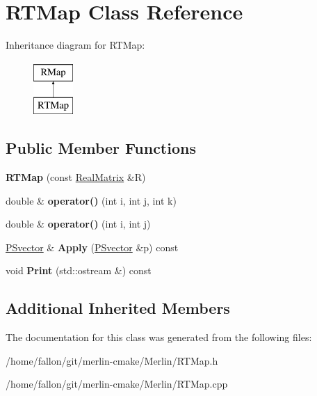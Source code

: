 \hypertarget{classRTMap}{}\section{R\+T\+Map Class Reference}
\label{classRTMap}
Inheritance diagram for R\+T\+Map\+:\begin{figure}[H]
\begin{center}
\leavevmode
\includegraphics[height=2.000000cm]{classRTMap}
\end{center}
\end{figure}
\subsection*{Public Member Functions}
\begin{DoxyCompactItemize}
\item 
\mbox{\label{classRTMap_aade87acf520b03c47e0f9a81e48fb4f3}} 
{\bfseries R\+T\+Map} (const \hyperlink{classTLAS_1_1Matrix}{Real\+Matrix} \&R)
\item 
\mbox{\label{classRTMap_a37c8097dc4bcf3fc17a6e6a8aaeb53d1}} 
double \& {\bfseries operator()} (int i, int j, int k)
\item 
\mbox{\label{classRTMap_a0fc735f8f3ef682249cf3f0e312daee1}} 
double \& {\bfseries operator()} (int i, int j)
\item 
\mbox{\label{classRTMap_a1267b88f696b11fb565adf0dec59581c}} 
\hyperlink{classPSvector}{P\+Svector} \& {\bfseries Apply} (\hyperlink{classPSvector}{P\+Svector} \&p) const
\item 
\mbox{\label{classRTMap_a1a6ba2770f3be2f9c2bb23a6b054ef69}} 
void {\bfseries Print} (std\+::ostream \&) const
\end{DoxyCompactItemize}
\subsection*{Additional Inherited Members}


The documentation for this class was generated from the following files\+:\begin{DoxyCompactItemize}
\item 
/home/fallon/git/merlin-\/cmake/\+Merlin/R\+T\+Map.\+h\item 
/home/fallon/git/merlin-\/cmake/\+Merlin/R\+T\+Map.\+cpp\end{DoxyCompactItemize}
